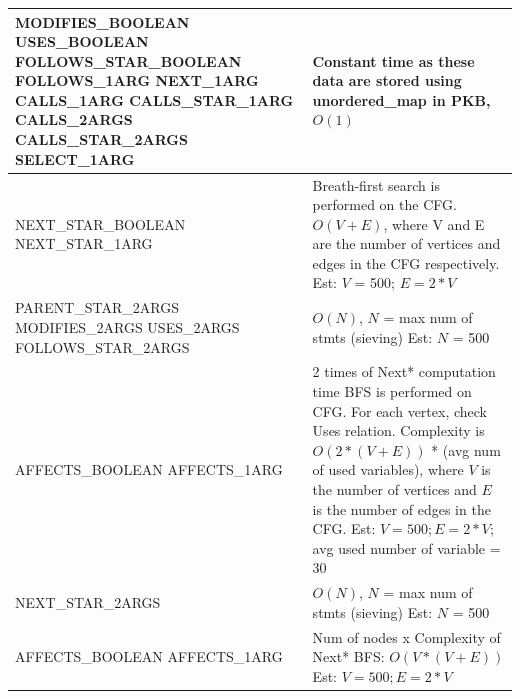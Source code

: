 \documentclass[12pt]{article}
\begin{document}
{{{{{{{{{{{{{\begin{center}
\begin{longtable}{ |L{8cm} | L{9cm}| }
MODIFIES\_BOOLEAN\newline
USES\_BOOLEAN\newline
FOLLOWS\_STAR\_BOOLEAN\newline
FOLLOWS\_1ARG\newline
NEXT\_1ARG\newline
CALLS\_1ARG\newline
CALLS\_STAR\_1ARG\newline
CALLS\_2ARGS\newline
CALLS\_STAR\_2ARGS\newline
SELECT\_1ARG\newline
 & Constant time as these data are stored using unordered\_map in PKB, $O(1)$
 \\\hline
\newline
NEXT\_STAR\_BOOLEAN\newline
NEXT\_STAR\_1ARG\newline
 & 
Breath-first search is performed on the CFG.
$O(V+E)$, where V and E are the number of vertices and edges in the CFG respectively.
Est: $V$ = 500; $E = 2 * V$
 \\\hline
\newline
PARENT\_STAR\_2ARGS\newline
MODIFIES\_2ARGS\newline
USES\_2ARGS\newline
FOLLOWS\_STAR\_2ARGS\newline
 & 
$O(N)$, $N$ = max num of stmts (sieving)
Est: $N$ = 500
 \\\hline
\newline
AFFECTS\_BOOLEAN\newline
AFFECTS\_1ARG\newline
 & 
2 times of Next* computation time
BFS is performed on CFG. For each vertex, check Uses relation. Complexity is $O(2*(V+E))$ * (avg num of used variables), where $V$ is the number of vertices and $E$ is the number of edges in the CFG.
Est: $V = 500; E = 2 * V$; avg used number of variable = 30
 \\\hline  
\newline
NEXT\_STAR\_2ARGS
\newline
 & 
$O(N)$, $N$ = max num of stmts (sieving)
Est: $N$ = 500
 \\\hline   
\newline
AFFECTS\_BOOLEAN\newline
AFFECTS\_1ARG\newline
 & 
Num of nodes x Complexity of Next*
BFS: $O(V*(V+E))$
Est: $V = 500; E = 2 * V$


\end{longtable}
\end{center}}}}}}}}}}}}}}
\end{document}
